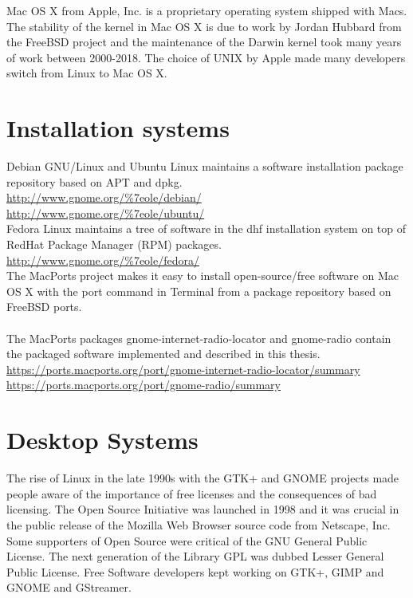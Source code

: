 \documentclass[a4paper,norsk,utf8]{report}
\begin{document}
    Mac OS X from Apple, Inc. is a proprietary operating system
    shipped with Macs.  The stability of the kernel in Mac OS X is due
    to work by Jordan Hubbard from the FreeBSD project and the
    maintenance of the Darwin kernel took many years of work between
    2000-2018.  The choice of UNIX by Apple made many developers
    switch from Linux to Mac OS X.

\chapter{Installation systems}

    Debian GNU/Linux and Ubuntu Linux maintains a software
    installation package repository based on APT and dpkg.\\

    \url{http://www.gnome.org/%7eole/debian/}
      \\
    \url{http://www.gnome.org/%7eole/ubuntu/}
      \\
      Fedora Linux maintains a tree of software in the dhf installation 
      system on top of RedHat Package Manager (RPM) packages.\\
    \url{http://www.gnome.org/%7eole/fedora/}
      \\
      The MacPorts project makes it easy to install open-source/free software
      on Mac OS X with the port command in Terminal from a package repository
      based on FreeBSD ports.\\
      \\
      The MacPorts packages gnome-internet-radio-locator and gnome-radio contain the packaged software implemented and described in this thesis.
      \\
      \url{https://ports.macports.org/port/gnome-internet-radio-locator/summary}\\
      \url{https://ports.macports.org/port/gnome-radio/summary}

\chapter{Desktop Systems}

    The rise of Linux in the late 1990s with the GTK+ and GNOME
    projects made people aware of the importance of free licenses and
    the consequences of bad licensing.  The Open Source Initiative was
    launched in 1998 and it was crucial in the public release of the
    Mozilla Web Browser source code from Netscape, Inc.  Some
    supporters of Open Source were critical of the GNU General Public
    License.  The next generation of the Library GPL was dubbed Lesser
    General Public License.  Free Software developers kept working on
    GTK+, GIMP and GNOME and GStreamer.
\end{document}
